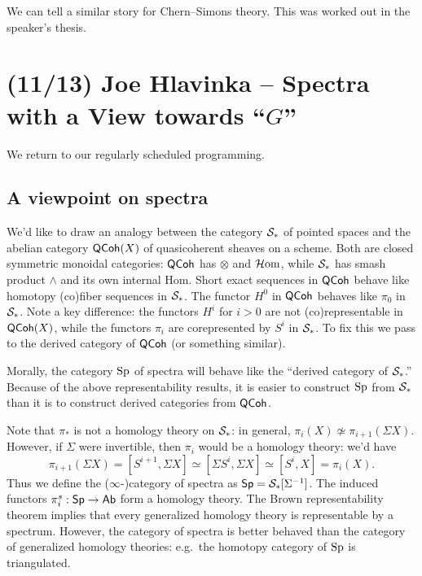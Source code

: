 \documentclass{article}
\begin{document}
\begin{ex}
  We can tell a similar story for Chern--Simons theory.
  This was worked out in the speaker's thesis.
\end{ex}

\section{(11/13) Joe Hlavinka -- Spectra with a View towards ``\texorpdfstring{$G$}{G}''}

We return to our regularly scheduled programming.

\subsection{A viewpoint on spectra}

We'd like to draw an analogy between the category $\mathcal{S}_*$ of pointed spaces and the abelian category $\mathsf{QCoh}(X)$ of quasicoherent sheaves on a scheme.
Both are closed symmetric monoidal categories: $\mathsf{QCoh}$ has $\otimes$ and $\mathcal{H}\mkern-3mu\operatorname{om}$, while $\mathcal{S}_*$ has smash product $\wedge$ and its own internal Hom.
Short exact sequences in $\mathsf{QCoh}$ behave like homotopy (co)fiber sequences in $\mathcal{S}_*$.
The functor $H^0$ in $\mathsf{QCoh}$ behaves like $\pi_0$ in $\mathcal{S}_*$.
Note a key difference: the functors $H^i$ for $i > 0$ are not (co)representable in $\mathsf{QCoh}(X)$, while the functors $\pi_i$ are corepresented by $S^i$ in $\mathcal{S}_*$.
To fix this we pass to the derived category of $\mathsf{QCoh}$ (or something similar).

Morally, the category $\operatorname{Sp}$ of spectra will behave like the ``derived category of $\mathcal{S}_*$.''
Because of the above representability results, it is easier to construct $\operatorname{Sp}$ from $\mathcal{S}_*$ than it is to construct derived categories from $\mathsf{QCoh}$.

Note that $\pi_*$ is not a homology theory on $\mathcal{S}_*$: in general, $\pi_i(X) \not\simeq \pi_{i+1}(\Sigma X)$.
However, if $\Sigma$ were invertible, then $\pi_i$ would be a homology theory: we'd have
\[
  \pi_{i+1}(\Sigma X) = [S^{i+1}, \Sigma X] \simeq [\Sigma S^i, \Sigma X] \simeq [S^i, X] = \pi_i(X).
\]
Thus we define the ($\infty$-)category of spectra as $\mathsf{Sp} = \mathcal{S}_*[\Sigma^{-1}]$.
The induced functors $\pi_i^s: \mathsf{Sp} \to \mathsf{Ab}$ form a homology theory.
The Brown representability theorem implies that every generalized homology theory is representable by a spectrum.
However, the category of spectra is better behaved than the category of generalized homology theories: e.g.\ the homotopy category of $\operatorname{Sp}$ is triangulated.
\end{document}
